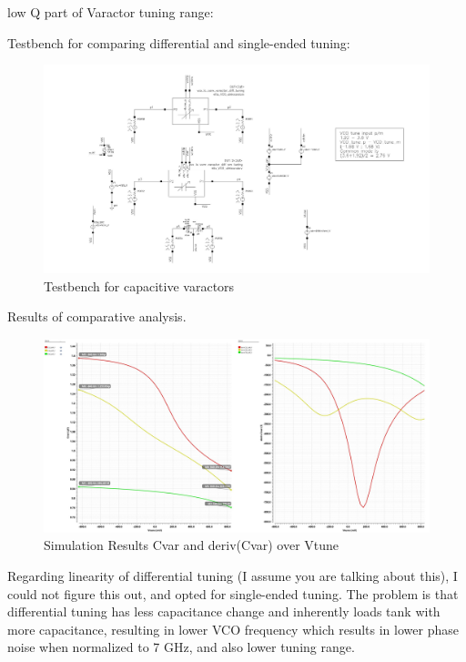 low Q part of Varactor tuning range: %

Testbench for comparing differential and single-ended tuning:

\begin{figure}[ht!]
	\centering
	\includegraphics[width=\linewidth]{Figures/cvar-testbench.jpg}
	\caption{Testbench for capacitive varactors}
	\label{fig:cvar-testbench}
\end{figure}

Results of comparative analysis.

\begin{figure}[ht!]
	\centering
	\includegraphics[width=\linewidth]{Figures/cvar-sweep-over-vtune-comparison.jpg}
	\caption{Simulation Results Cvar and deriv(Cvar) over Vtune}
	\label{fig:cvar-sweep-over-vtune-comparison}
\end{figure}

Regarding linearity of differential tuning (I assume you are talking about this), I could not figure this out, and opted for single-ended tuning. The problem is that differential tuning has less capacitance change and inherently loads tank with more capacitance, resulting in lower VCO frequency which results in lower phase noise when normalized to 7 GHz, and also lower tuning range.


